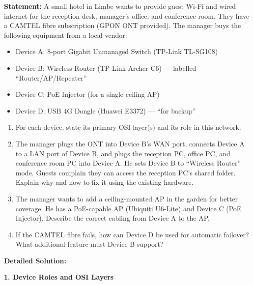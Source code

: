\documentclass[11pt]{article}
\begin{document}
\begin{exoresolu}
\textbf{Statement:} 
A small hotel in Limbe wants to provide guest Wi-Fi and wired internet for the reception desk, manager's office, and conference room. They have a CAMTEL fibre subscription (GPON ONT provided). The manager buys the following equipment from a local vendor:
\begin{itemize}
\item Device A: 8-port Gigabit Unmanaged Switch (TP-Link TL-SG108)
\item Device B: Wireless Router (TP-Link Archer C6) — labelled ``Router/AP/Repeater''
\item Device C: PoE Injector (for a single ceiling AP)
\item Device D: USB 4G Dongle (Huawei E3372) — ``for backup''
\end{itemize}
\begin{enumerate}
\item For each device, state its primary OSI layer(s) and its role in this network.
\item The manager plugs the ONT into Device B's WAN port, connects Device A to a LAN port of Device B, and plugs the reception PC, office PC, and conference room PC into Device A. He sets Device B to ``Wireless Router'' mode. Guests complain they can access the reception PC's shared folder. Explain why and how to fix it using the existing hardware.
\item The manager wants to add a ceiling-mounted AP in the garden for better coverage. He has a PoE-capable AP (Ubiquiti U6-Lite) and Device C (PoE Injector). Describe the correct cabling from Device A to the AP.
\item If the CAMTEL fibre fails, how can Device D be used for automatic failover? What additional feature must Device B support?
\end{enumerate}
\tcblower
\textbf{Detailed Solution:}

\textbf{1. Device Roles and OSI Layers}


\end{exoresolu}
\end{document}
